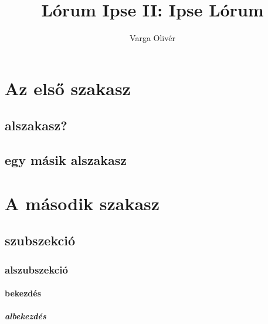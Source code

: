 \documentclass[]{book}
\title{Lórum Ipse II: Ipse Lórum}
\author{Varga Olivér}
\begin{document}
\maketitle
\tableofcontents
\section[1. szakasz]{Az első szakasz}
\subsection{alszakasz?}
\hulipsum[1-8]
\subsection{egy másik alszakasz}
\hulipsum[9-12]
\section[2. szakasz]{A második szakasz}
\subsection{szubszekció}
\subsubsection{alszubszekció}
\paragraph{bekezdés}
\subparagraph{albekezdés}
\hulipsum[13-14]
\end{document}
